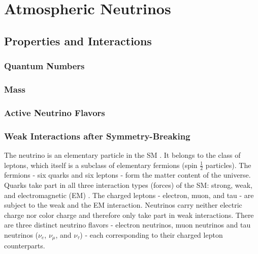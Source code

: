 \section{Atmospheric Neutrinos}

\subsection{Properties and Interactions}

\subsubsection{Quantum Numbers}
\subsubsection{Mass}
\subsubsection{Active Neutrino Flavors}

\subsubsection{Weak Interactions after Symmetry-Breaking}

The neutrino is an elementary particle in the SM .
It belongs to the class of leptons, which itself is a subclass of elementary fermions (spin ${\frac{1}{2}}$ particles).
The fermions - six quarks and six leptons - form the matter content of the universe.
Quarks take part in all three interaction types (forces) of the SM: strong, weak, and electromagnetic (EM) .
The charged leptons - electron, muon, and tau - are subject to the weak and the EM interaction.
Neutrinos carry neither electric charge nor color charge and therefore only take part in weak interactions.
There are three distinct neutrino flavors - electron neutrinos, muon neutrinos and tau neutrinos ($\nu_e$, $\nu_{\mu}$, and $\nu_{\tau}$)  - each corresponding to their charged lepton counterparts.

